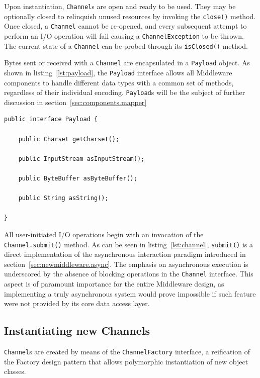 Upon instantiation, \texttt{Channel}s are open and ready to be used. They may
be optionally closed to relinquish unused resources by invoking the
\texttt{close()} method. Once closed, a \texttt{Channel} cannot be re-opened,
and every subsequent attempt to perform an I/O operation will fail causing a
\texttt{ChannelException} to be thrown. The current state of a \texttt{Channel}
can be probed through its \texttt{isClosed()} method.

Bytes sent or received with a \texttt{Channel} are encapsulated in a
\texttt{Payload} object. As shown in listing~\ref{lst:payload}, the
\texttt{Payload} interface allows all Middleware components to handle different
data types with a common set of methods, regardless of their individual
encoding.  \texttt{Payload}s will be the subject of further discussion in
section~\ref{sec:components.mapper}

\lstset{language=Java}
\begin{lstlisting}[float,caption=The Payload interface,label={lst:payload}]
public interface Payload {

	public Charset getCharset();

	public InputStream asInputStream();

	public ByteBuffer asByteBuffer();

	public String asString();

}
\end{lstlisting}

All user-initiated I/O operations begin with an invocation of the
\texttt{Channel.submit()} method. As can be seen in listing~\ref{lst:channel},
\texttt{submit()} is a direct implementation of the asynchronous interaction
paradigm introduced in section~\ref{sec:newmiddleware.async}. The emphasis on
asynchronous execution is underscored by the absence of blocking operations in
the \texttt{Channel} interface. This aspect is of paramount importance for the
entire Middleware design, as implementing a truly asynchronous system would
prove impossible if such feature were not provided by its core data access
layer.


\subsection{Instantiating new Channels}

\texttt{Channel}s are created by means of the \texttt{ChannelFactory}
interface, a reification of the Factory design pattern that allows polymorphic
instantiation of new object classes.


